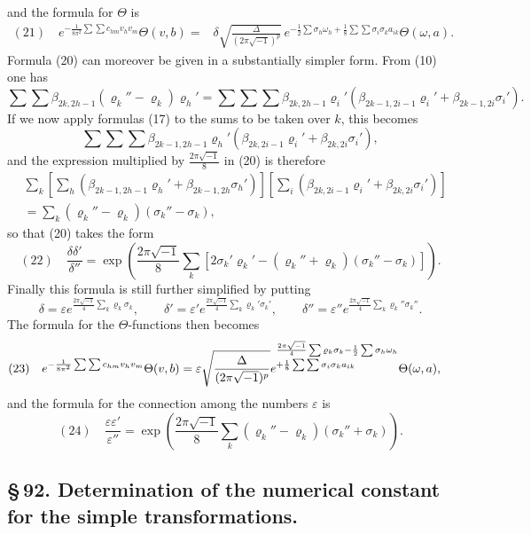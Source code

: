 \documentclass[10pt]{article}
\begin{document}
and the formula for \(\Theta\) is
\[
\begin{aligned}
(21)\quad
e^{-\frac{1}{8\pi^2}\sum\sum c_{hm}v_hv_m}\Theta(v,b)
={}&\delta\sqrt{\frac{\Delta}{(2\pi\sqrt{-1})^p}}\,
 e^{-\frac12\sum\sigma_h\omega_h+\frac18\sum\sum\sigma_i\sigma_ka_{ik}}\Theta(\omega,a).
\end{aligned}
\]
Formula (20) can moreover be given in a substantially simpler form. From (10) one has
\[
\sum\sum\beta_{2k,2h-1}(\varrho_k''-\varrho_k)\varrho_h'
=\sum\sum\sum\beta_{2k,2h-1}\varrho_i'(\beta_{2k-1,2i-1}\varrho_i'+\beta_{2k-1,2i}\sigma_i').
\]
If we now apply formulas (17) to the sums to be taken over \(k\), this becomes
\[
\sum\sum\sum\beta_{2k-1,2h-1}\varrho_h'(\beta_{2k,2i-1}\varrho_i'+\beta_{2k,2i}\sigma_i'),
\]
and the expression multiplied by \(\frac{2\pi\sqrt{-1}}8\) in (20) is therefore
\[
\begin{aligned}
&\sum_k\left[\sum_h(\beta_{2k-1,2h-1}\varrho_h'+\beta_{2k-1,2h}\sigma_h')\right]
\left[\sum_i(\beta_{2k,2i-1}\varrho_i'+\beta_{2k,2i}\sigma_i')\right]\\
&=\sum_k(\varrho_k''-\varrho_k)(\sigma_k''-\sigma_k),
\end{aligned}
\]
so that (20) takes the form
\[
(22)\quad
\frac{\delta\delta'}{\delta''}
=\exp\!\left(\frac{2\pi\sqrt{-1}}8\sum_k[2\sigma_k'\varrho_k'-(\varrho_k''+\varrho_k)(\sigma_k''-\sigma_k)]\right).
\]
Finally this formula is still further simplified by putting
\[
\delta=\varepsilon e^{\frac{2\pi\sqrt{-1}}4\sum_k\varrho_k\sigma_k},
\qquad
\delta'=\varepsilon' e^{\frac{2\pi\sqrt{-1}}4\sum_k\varrho_k'\sigma_k'},
\qquad
\delta''=\varepsilon'' e^{\frac{2\pi\sqrt{-1}}4\sum_k\varrho_k''\sigma_k''}.
\]
The formula for the \(\Theta\)-functions then becomes
\[
\begin{aligned}
(23)\quad
e^{-\frac{1}{8\pi^2}\sum\sum c_{hm}v_hv_m}\Theta(v,b)
={}&\varepsilon\sqrt{\frac{\Delta}{(2\pi\sqrt{-1})^p}}
 e^{\begin{subarray}{l}\frac{2\pi\sqrt{-1}}4\sum\varrho_k\sigma_k-\frac12\sum\sigma_h\omega_h\\[0.1em]
 +\frac18\sum\sum\sigma_i\sigma_ka_{ik}\end{subarray}}\Theta(\omega,a),
\end{aligned}
\]
and the formula for the connection among the numbers \(\varepsilon\) is
\[
(24)\quad
\frac{\varepsilon\varepsilon'}{\varepsilon''}
=\exp\!\left(\frac{2\pi\sqrt{-1}}8\sum_k(\varrho_k''-\varrho_k)(\sigma_k''+\sigma_k)\right).
\]

\subsection*{\S\,92. Determination of the numerical constant for the simple transformations.}
\end{document}

